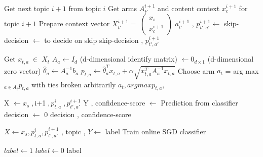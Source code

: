 \begin{algorithm}                     
\begin{algorithmic} [1]                   %
        \State Get next topic $i+1$ from topic $i$
        \State Get arms $A^{i+1}_{t'}$ and content context $x^{i+1}_{c}$ for topic $i+1$ 
        \State Prepare context vector $X^{i+1}_{t'} =\; \begin{pmatrix} x_s \\ x^{i+1}_{c} \end{pmatrix}$
        \State $a^{i+1}_{t'}$ , $p^{i+1}_{t',a'} \gets$ 
        \State skip-decision $\gets$  to decide on skip
        \State \Return skip-decision , $p^{i+1}_{t',a'}$
    \EndFunction
    
        \State Get $x_{t,a}\; \in \; X_t$
                \State $A_a \gets I_d$ (d-dimensional identify matrix)
                \State {} $\gets 0_{d \times 1}$ (d-dimensional zero vector)
            \EndIf
            \State $\widehat{\theta}_a \gets A^{-1}_{a}b_a $
            \State $p_{t,a} \gets \widehat{\theta}^{T}_{a}x_{t,a} + \alpha \sqrt{x^{T}_{t,a}A^{-1}_{a}x_{t,a}}$
        \EndFor
        \State Choose arm $a_{t}$ = arg max$_{a \in A_t} p_{t,a}$ with ties broken arbitrarily
        \State \Return $a_t , arg max p_{t,a}, $
    \EndFunction
    
        \State X $\gets {x_s} \; , ${i+1}$ \; , p^{i}_{t,a} \; , p^{i+1}_{t',a'}$
        \State Y , confidence-score $\gets$ Prediction \; from \; classifier
        \State decision $\gets$ 0
        \EndIf
        \State \Return \; decision , confidence-score
    \EndFunction
    
        \State $X \gets x_s , p^{i}_{t,a} , p^{i+1}_{t',a'} $ , topic ,
        \State $Y \gets$ label
        \State Train online SGD classifier
    \EndFunction
    
        \State $label \gets 1$
        \Else
        \State $label \gets 0$
        \EndIf
        \State \Return label
    \EndFunction
    
\end{algorithmic}
\end{algorithm}

